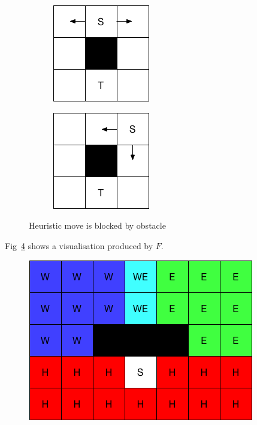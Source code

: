 \begin{itemize}
    \begin{figure}[h]
      \centering
      \begin{subfigure}{.35\columnwidth}
      \centering
        \includegraphics[width=.6\columnwidth]{./hmove3.png}
        \caption{}
        \label{hmove3_1}
      \end{subfigure}%
      \begin{subfigure}{.35\columnwidth}
      \centering
        \includegraphics[width=.6\columnwidth]{./hmove3_2.png}
        \caption{}
        \label{hmove3_2}
      \end{subfigure}
      \caption{\small Heuristic move is blocked by obstacle}
      \label{hmove3}
    \end{figure}
  \end{itemize}

Fig~\ref{grid1} shows a visualisation produced by $F$.

\begin{figure}[t]
  \centering
  \includegraphics[width=.5\columnwidth]{./grid.png}
  \caption{}
  \label{grid1}
\end{figure}

